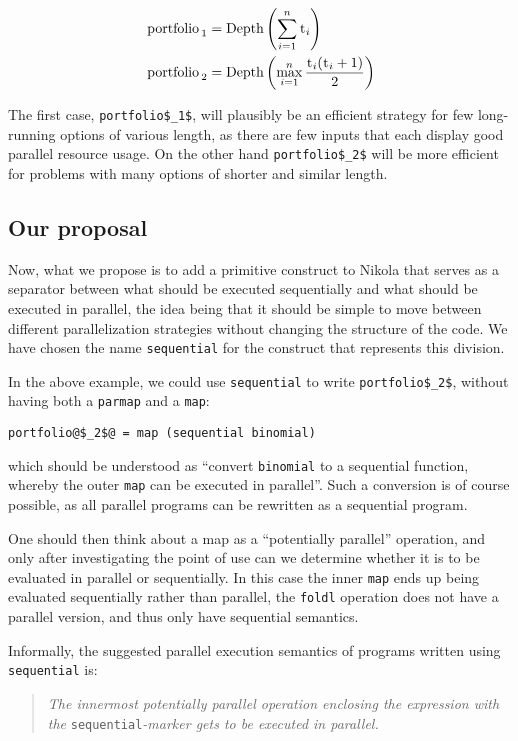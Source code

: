 \begin{align*}
  \text{\lstinline{portfolio}}_1 &= \textrm{Depth}\left(\sum_{i=1}^{n} \text{\lstinline{t}}_i\right) \\
  \text{\lstinline{portfolio}}_2 &= \textrm{Depth}\left(\max_{i=1}^{n} \frac{\text{\lstinline{t}}_i(\text{\lstinline{t}}_i+1)}{2}\right) \\
\end{align*}

The first case, \lstinline[mathescape]{portfolio$_1$}, will plausibly be an
efficient strategy for few long-running options of various length, as there are
few inputs that each display good parallel resource usage. On the other hand
\lstinline[mathescape]{portfolio$_2$} will be more efficient for problems with
many options of shorter and similar length.

\subsection{Our proposal}
Now, what we propose is to add a primitive construct to Nikola that
serves as a separator between what should be executed sequentially and
what should be executed in parallel, the idea being that it should be
simple to move between different parallelization strategies  without
changing the structure of the code. We have chosen the name \lstinline{sequential}
for the construct that represents this division.

In the above example, we could use \lstinline{sequential} to write
\lstinline[mathescape]{portfolio$_2$}, without having both a \lstinline{parmap}
and a \lstinline{map}:
\begin{lstlisting}
portfolio@$_2$@ = map (sequential binomial)
\end{lstlisting}
which should be understood as ``convert \lstinline{binomial} to a sequential
function, whereby the outer \lstinline{map} can be executed in
parallel''. Such a conversion is of course possible, as all parallel
programs can be rewritten as a sequential program.

One should then think about a map as a ``potentially parallel'' operation,
and only after investigating the point of use can we determine
whether it is to be evaluated in parallel or sequentially. In this
case the inner \lstinline{map} ends up being evaluated sequentially
rather than parallel, the \lstinline{foldl} operation does not have a
parallel version, and thus only have sequential semantics.

Informally, the suggested parallel execution semantics of programs written using
\lstinline{sequential} is:
\begin{quote}
  \emph{The innermost potentially parallel operation enclosing the
    expression with the }\lstinline{sequential}\emph{-marker gets to
    be executed in parallel.}
\end{quote}

